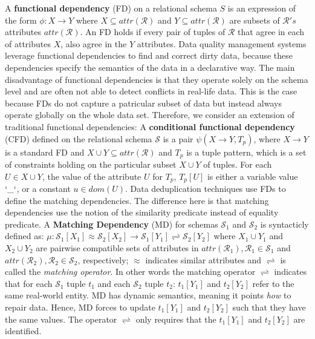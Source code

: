 A \textbf{functional dependency} (FD) on a relational schema $S$ is an expression of the form $\phi: X \rightarrow Y$ where $X \subseteq attr(\mathcal{R}) $ and $Y \subseteq attr(\mathcal{R}) $ are subsets of $\mathcal{R}'s$ attributes $attr(\mathcal{R})$. An FD holds if every pair of tuples of $\mathcal{R}$ that agree in each of attributes $X$, also agree in the $Y$ attributes. Data quality management systems leverage functional dependencies to find and correct dirty data, because these dependencies specify the semantics of the data in a declarative way. The main disadvantage of functional dependencies is that they operate solely on the schema level and are often not able to detect conflicts in real-life data. This is the case because FDs do not capture a patricular subset of data but instead always operate globally on the whole data set.
Therefore, we consider an extension of traditional functional dependencies:  A \textbf{conditional functional dependency} (CFD) 
defined on the relational schema $\mathcal{S}$ is a pair $\psi(X \rightarrow Y , T_p)$,  where $X \rightarrow Y$ is a standard 
FD and $X \cup Y \subseteq attr(\mathcal{R})$ and $T_p$ is a tuple pattern, which is a set of constraints holding on the particular 
subset $X \cup Y$ of tuples. For each $U \in X \cup Y$, the value of the attribute $U$ for $T_p$, $T_p[U]$ is either a variable 
value $`\_`$, or a constant $u \in dom(U)$. Data deduplication techniques use FDs to define the matching dependencies. The 
difference here is that matching dependencies use the notion of the similarity predicate instead of equality predicate. A 
\textbf{Matching Dependency} (MD) for schemas $\mathcal{S}_1$ and $\mathcal{S}_2$ is syntacticly defined as:
$\mu: \mathcal{S}_1[X_1]\approx \mathcal{S}_2[X_2]\rightarrow \mathcal{S}_1[Y_1]\rightleftharpoons \mathcal{S}_2[Y_2]$ 
where $X_1 \cup Y_1$ and $X_2 \cup Y_2$ are pairwise compatible sets of attributes in $attr(\mathcal{R}_1), \mathcal{R}_1\in \mathcal{S}_1$ 
and $attr(\mathcal{R}_2), \mathcal{R}_2\in \mathcal{S}_2$, respectively; $\approx$ indicates similar attributes and $\rightleftharpoons$ 
is called the \textit{matching operator}. In other words the matching operator $\rightleftharpoons$ indicates that for each $\mathcal{S}_1$ tuple $t_1$ and each $\mathcal{S}_2$ tuple $t_2$: $t_1[Y_1]$ and $t_2[Y_2]$ refer to the same real-world entity. MD has dynamic semantics, meaning it points \textit{how} to repair data. Hence, MD forces to update $t_1[Y_1]$ and $t_2[Y_2]$ such that they have the same values. %
The operator $\rightleftharpoons$ only requires that the $t_1[Y_1]$ and $t_2[Y_2]$ are identified.
